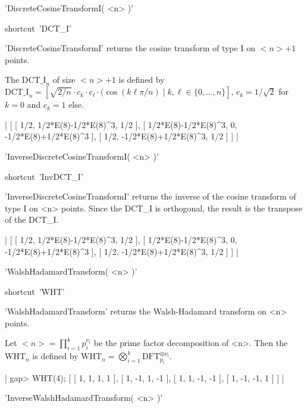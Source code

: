
'DiscreteCosineTransformI( <n> )'

shortcut\:\ 'DCT\_I'

'DiscreteCosineTransformI' returns the cosine transform of
type I on $<n>+1$ points.

The $\mbox{DCT\_I}_n$ of size $<n>+1$ is defined by 
$\mbox{DCT\_I}_n = [\sqrt{2/n}\cdot c_k\cdot c_\ell\cdot
(\cos(k\ell\pi/n)\mid k,\ell\in\{0,\dots,n\}]$, 
$c_k = 1/\sqrt{2}$ for $k = 0$ and $c_k = 1$ else.

|    [ [ 1/2, 1/2*E(8)-1/2*E(8)^3, 1/2 ], 
      [ 1/2*E(8)-1/2*E(8)^3, 0, -1/2*E(8)+1/2*E(8)^3 ], 
      [ 1/2, -1/2*E(8)+1/2*E(8)^3, 1/2 ] ] |


'InverseDiscreteCosineTransformI( <n> )'

shortcut\:\ 'InvDCT\_I'

'InverseDiscreteCosineTransformI' returns the inverse of the 
cosine transform of type I on <n> points. Since the
DCT\_I is orthogonal, the result is the transpose of the DCT\_I.

|    [ [ 1/2, 1/2*E(8)-1/2*E(8)^3, 1/2 ], 
      [ 1/2*E(8)-1/2*E(8)^3, 0, -1/2*E(8)+1/2*E(8)^3 ], 
      [ 1/2, -1/2*E(8)+1/2*E(8)^3, 1/2 ] ] |


'WalshHadamardTransform( <n> )'

shortcut\:\ 'WHT'

'WalshHadamardTransform' returns the Walsh-Hadamard transform 
on <n> points. 

Let $<n> = \prod_{i=1}^k p_i^{\nu_i}$ be the prime factor 
decomposition of <n>.
Then the $\mbox{WHT}_n$ is defined by
$\mbox{WHT}_n = \bigotimes_{i=1}^k \mbox{DFT}_{p_i}^{\otimes\nu_i}$.

|    gap> WHT(4);
    [ [ 1, 1, 1, 1 ], [ 1, -1, 1, -1 ], 
      [ 1, 1, -1, -1 ], [ 1, -1, -1, 1 ] ] |


'InverseWalshHadamardTransform( <n> )'

